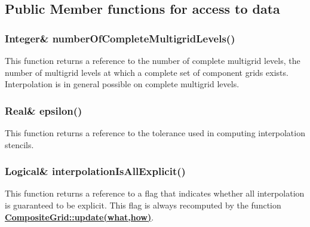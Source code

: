 \documentclass{article}
\begin{document}

\subsection{Public Member functions for access to data}
\label{CompositeGrid::PublicAccessToData}

  \subsubsection{Integer\& numberOfCompleteMultigridLevels()}
  \label{CompositeGrid::numberOfCompleteMultigridLevels() const}
    This function returns a reference to the number of complete multigrid levels,
    the number of multigrid levels at which a complete set of component grids exists.
    Interpolation is in general possible on complete multigrid levels.

  \subsubsection{Real\& epsilon()}
  \label{CompositeGrid::epsilon() const}
    This function returns a reference to the tolerance used in computing interpolation stencils.

  \subsubsection{Logical\& interpolationIsAllExplicit()}
  \label{CompositeGrid::interpolationIsAllExplicit() const}
    This function returns a reference to a flag that indicates whether all interpolation is guaranteed to be explicit.
    This flag is always recomputed by the function
    {\bf{}\hyperref{update(what,how)}{update(what,how) \rm(\S}{)}{CompositeGrid::update(what,how)}}.
\end{document}
